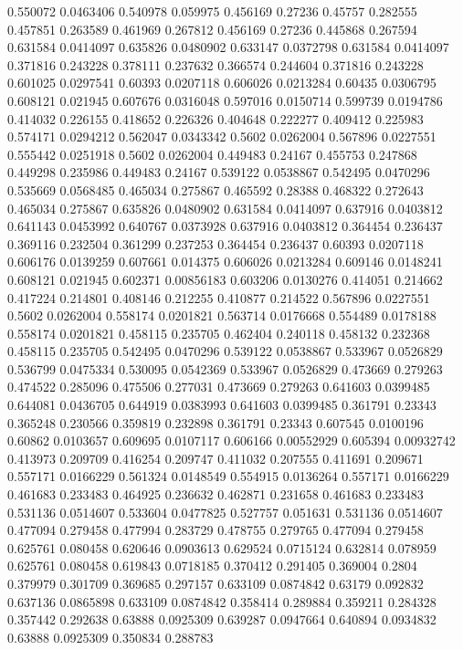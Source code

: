 0.550072 0.0463406
0.540978 0.059975
0.456169 0.27236
0.45757 0.282555
0.457851 0.263589
0.461969 0.267812
0.456169 0.27236
0.445868 0.267594
0.631584 0.0414097
0.635826 0.0480902
0.633147 0.0372798
0.631584 0.0414097
0.371816 0.243228
0.378111 0.237632
0.366574 0.244604
0.371816 0.243228
0.601025 0.0297541
0.60393 0.0207118
0.606026 0.0213284
0.60435 0.0306795
0.608121 0.021945
0.607676 0.0316048
0.597016 0.0150714
0.599739 0.0194786
0.414032 0.226155
0.418652 0.226326
0.404648 0.222277
0.409412 0.225983
0.574171 0.0294212
0.562047 0.0343342
0.5602 0.0262004
0.567896 0.0227551
0.555442 0.0251918
0.5602 0.0262004
0.449483 0.24167
0.455753 0.247868
0.449298 0.235986
0.449483 0.24167
0.539122 0.0538867
0.542495 0.0470296
0.535669 0.0568485
0.465034 0.275867
0.465592 0.28388
0.468322 0.272643
0.465034 0.275867
0.635826 0.0480902
0.631584 0.0414097
0.637916 0.0403812
0.641143 0.0453992
0.640767 0.0373928
0.637916 0.0403812
0.364454 0.236437
0.369116 0.232504
0.361299 0.237253
0.364454 0.236437
0.60393 0.0207118
0.606176 0.0139259
0.607661 0.014375
0.606026 0.0213284
0.609146 0.0148241
0.608121 0.021945
0.602371 0.00856183
0.603206 0.0130276
0.414051 0.214662
0.417224 0.214801
0.408146 0.212255
0.410877 0.214522
0.567896 0.0227551
0.5602 0.0262004
0.558174 0.0201821
0.563714 0.0176668
0.554489 0.0178188
0.558174 0.0201821
0.458115 0.235705
0.462404 0.240118
0.458132 0.232368
0.458115 0.235705
0.542495 0.0470296
0.539122 0.0538867
0.533967 0.0526829
0.536799 0.0475334
0.530095 0.0542369
0.533967 0.0526829
0.473669 0.279263
0.474522 0.285096
0.475506 0.277031
0.473669 0.279263
0.641603 0.0399485
0.644081 0.0436705
0.644919 0.0383993
0.641603 0.0399485
0.361791 0.23343
0.365248 0.230566
0.359819 0.232898
0.361791 0.23343
0.607545 0.0100196
0.60862 0.0103657
0.609695 0.0107117
0.606166 0.00552929
0.605394 0.00932742
0.413973 0.209709
0.416254 0.209747
0.411032 0.207555
0.411691 0.209671
0.557171 0.0166229
0.561324 0.0148549
0.554915 0.0136264
0.557171 0.0166229
0.461683 0.233483
0.464925 0.236632
0.462871 0.231658
0.461683 0.233483
0.531136 0.0514607
0.533604 0.0477825
0.527757 0.051631
0.531136 0.0514607
0.477094 0.279458
0.477994 0.283729
0.478755 0.279765
0.477094 0.279458
0.625761 0.080458
0.620646 0.0903613
0.629524 0.0715124
0.632814 0.078959
0.625761 0.080458
0.619843 0.0718185
0.370412 0.291405
0.369004 0.2804
0.379979 0.301709
0.369685 0.297157
0.633109 0.0874842
0.63179 0.092832
0.637136 0.0865898
0.633109 0.0874842
0.358414 0.289884
0.359211 0.284328
0.357442 0.292638
0.63888 0.0925309
0.639287 0.0947664
0.640894 0.0934832
0.63888 0.0925309
0.350834 0.288783
